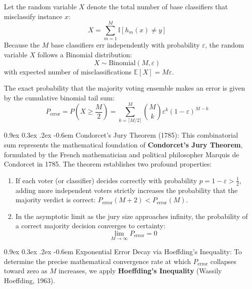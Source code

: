 \documentclass[11pt,a4paper]{article}
\makeatletter
\renewcommand\paragraph{\@startsection{paragraph}{4}{\z@}%
                                     {0.9ex \@plus0.3ex \@minus.2ex}%
                                     {-0.6em}%
                                     {\normalfont\normalsize\bfseries}}
\newcommand{\E}{\mathbb{E}}
\makeatother
\begin{document}
Let the random variable $X$ denote the total number of base classifiers that misclassify instance $x$:
\begin{equation}
    X = \sum_{m=1}^M \mathbb{I}[h_m(x) \ne y]
\end{equation}
Because the $M$ base classifiers err independently with probability $\varepsilon$, the random variable $X$ follows a Binomial distribution:
\begin{equation}
    X \sim \text{Binomial}(M, \varepsilon)
\end{equation}
with expected number of misclassifications $\E[X] = M\varepsilon$.

The exact probability that the majority voting ensemble makes an error is given by the cumulative binomial tail sum:
\begin{equation}
    P_{\text{error}} = P\left( X \ge \frac{M}{2} \right) = \sum_{k=\lceil M/2 \rceil}^M \binom{M}{k} \varepsilon^k (1 - \varepsilon)^{M - k}
\end{equation}

\paragraph{Condorcet's Jury Theorem (1785):}
This combinatorial sum represents the mathematical foundation of \textbf{Condorcet's Jury Theorem}, formulated by the French mathematician and political philosopher Marquis de Condorcet in 1785. The theorem establishes two profound properties:
\begin{enumerate}
    \item If each voter (or classifier) decides correctly with probability $p = 1 - \varepsilon > \frac{1}{2}$, adding more independent voters strictly increases the probability that the majority verdict is correct: $P_{\text{error}}(M + 2) < P_{\text{error}}(M)$.
    \item In the asymptotic limit as the jury size approaches infinity, the probability of a correct majority decision converges to certainty:
    \begin{equation}
        \lim_{M \to \infty} P_{\text{error}} = 0
    \end{equation}
\end{enumerate}

\paragraph{Exponential Error Decay via Hoeffding's Inequality:}
To determine the precise mathematical convergence rate at which $P_{\text{error}}$ collapses toward zero as $M$ increases, we apply \textbf{Hoeffding's Inequality} (Wassily Hoeffding, 1963).
\end{document}
